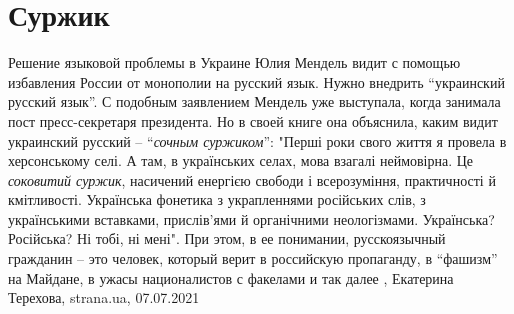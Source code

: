  
 
 
 
 
\chapter{Суржик}

Решение языковой проблемы в Украине Юлия Мендель видит с помощью избавления
России от монополии на русский язык. Нужно внедрить \enquote{украинский русский
язык}.  С подобным заявлением Мендель уже выступала, когда занимала пост
пресс-секретаря президента. Но в своей книге она объяснила, каким видит
украинский русский – \enquote{\emph{сочным суржиком}}: "Перші роки свого життя
я провела в херсонському селі. А там, в українських селах, мова взагалі
неймовірна. Це \emph{соковитий суржик}, насичений енергією свободи і
всерозуміння, практичності й кмітливості. Українська фонетика з украпленнями
російських слів, з українськими вставками, прислів’ями й органічними
неологізмами. Українська? Російська? Ні тобі, ні мені".  При этом, в ее
понимании, русскоязычный гражданин – это человек, который верит в российскую
пропаганду, в \enquote{фашизм} на Майдане, в ужасы националистов с факелами и
так далее
, 
Екатерина Терехова, strana.ua, 07.07.2021
